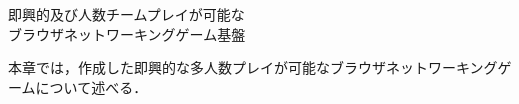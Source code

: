 \chapterhead
{即興的及び人数チームプレイが可能な\\ブラウザネットワーキングゲーム基盤}

{本章では，作成した即興的な多人数プレイが可能なブラウザネットワーキングゲームについて述べる．}




\newpage
